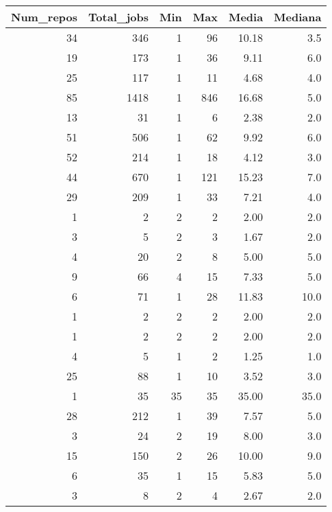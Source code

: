 \begin{tabular}{rrrrrr}
\toprule
 Num\_repos &  Total\_jobs &  Min &  Max &  Media &  Mediana \\
\midrule
        34 &         346 &    1 &   96 &  10.18 &      3.5 \\
        19 &         173 &    1 &   36 &   9.11 &      6.0 \\
        25 &         117 &    1 &   11 &   4.68 &      4.0 \\
        85 &        1418 &    1 &  846 &  16.68 &      5.0 \\
        13 &          31 &    1 &    6 &   2.38 &      2.0 \\
        51 &         506 &    1 &   62 &   9.92 &      6.0 \\
        52 &         214 &    1 &   18 &   4.12 &      3.0 \\
        44 &         670 &    1 &  121 &  15.23 &      7.0 \\
        29 &         209 &    1 &   33 &   7.21 &      4.0 \\
         1 &           2 &    2 &    2 &   2.00 &      2.0 \\
         3 &           5 &    2 &    3 &   1.67 &      2.0 \\
         4 &          20 &    2 &    8 &   5.00 &      5.0 \\
         9 &          66 &    4 &   15 &   7.33 &      5.0 \\
         6 &          71 &    1 &   28 &  11.83 &     10.0 \\
         1 &           2 &    2 &    2 &   2.00 &      2.0 \\
         1 &           2 &    2 &    2 &   2.00 &      2.0 \\
         4 &           5 &    1 &    2 &   1.25 &      1.0 \\
        25 &          88 &    1 &   10 &   3.52 &      3.0 \\
         1 &          35 &   35 &   35 &  35.00 &     35.0 \\
        28 &         212 &    1 &   39 &   7.57 &      5.0 \\
         3 &          24 &    2 &   19 &   8.00 &      3.0 \\
        15 &         150 &    2 &   26 &  10.00 &      9.0 \\
         6 &          35 &    1 &   15 &   5.83 &      5.0 \\
         3 &           8 &    2 &    4 &   2.67 &      2.0 \\

\end{tabular}
